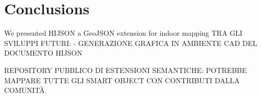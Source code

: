 \documentclass{sig-alternate}
\begin{document}
\section{Conclusions}\label{conclusions}

We presented HIJSON a GeoJSON extension for indoor mapping TRA GLI
SVILUPPI FUTURI: - GENERAZIONE GRAFICA IN AMBIENTE CAD DEL DOCUMENTO
HIJSON

REPOSITORY PUBBLICO DI ESTENSIONI SEMANTICHE: POTREBBE MAPPARE TUTTE
GLI SMART OBJECT CON CONTRIBUTI DALLA COMUNITÀ. 

%

%
%
\end{document}
